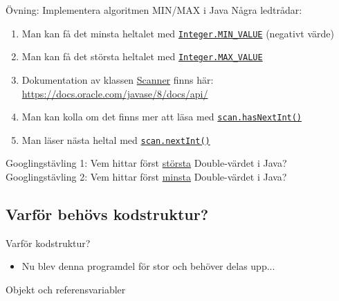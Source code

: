 \documentclass{lecturenotes}
\begin{document}
\begin{Slide}{Övning: Implementera algoritmen MIN/MAX i Java}
\footnotesize
Några ledtrådar:
\begin{enumerate}
\item Man kan få det minsta heltalet med \href{https://docs.oracle.com/javase/8/docs/api/java/lang/Integer.html}{\lstinline{Integer.MIN_VALUE}} (negativt värde)
\item Man kan få det största heltalet med \href{https://docs.oracle.com/javase/8/docs/api/java/lang/Integer.html}{\lstinline{Integer.MAX_VALUE}}
\item Dokumentation av klassen \href{https://docs.oracle.com/javase/8/docs/api/java/util/Scanner.html}{Scanner} finns här: \url{https://docs.oracle.com/javase/8/docs/api/}
\item Man kan kolla om det finns mer att läsa med \href{https://docs.oracle.com/javase/8/docs/api/java/util/Scanner.html#hasNextInt--}{\lstinline{scan.hasNextInt()}}
\item Man läser nästa heltal med  \href{http://docs.oracle.com/javase/8/docs/api/java/util/Scanner.html#nextInt%28%29}{\lstinline{scan.nextInt()}}
\end{enumerate}
\vspace{2em}
\scriptsize Googlingstävling 1: Vem hittar först \underline{största} Double-värdet i Java? \\ Googlingstävling 2: Vem hittar först \underline{minsta} Double-värdet i Java?
\end{Slide}

\subsection{Varför behövs kodstruktur?}
\begin{Slide}{Varför kodstruktur?}
\begin{itemize}
\item Nu blev denna programdel för stor och behöver delas upp...
\end{itemize}
\end{Slide}


\begin{Slide}{Objekt och referensvariabler}
\end{Slide}
\end{document}
